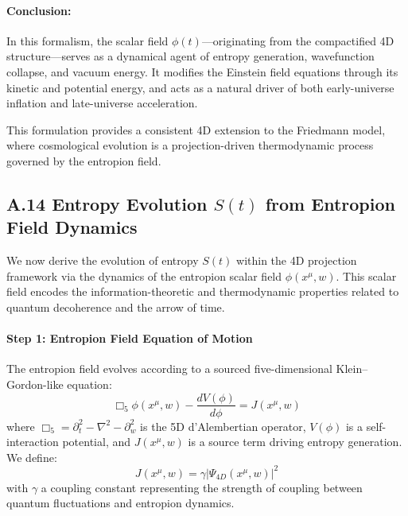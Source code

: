 \documentclass[12pt]{article}
\begin{document}
\vspace{1em}
\noindent
\paragraph{Conclusion:}

In this formalism, the scalar field \(\phi(t)\)—originating from the compactified 4D structure—serves as a dynamical agent of entropy generation, wavefunction collapse, and vacuum energy. It modifies the Einstein field equations through its kinetic and potential energy, and acts as a natural driver of both early-universe inflation and late-universe acceleration.

This formulation provides a consistent 4D extension to the Friedmann model, where cosmological evolution is a projection-driven thermodynamic process governed by the entropion field.
\subsection*{A.14 \quad Entropy Evolution \( S(t) \) from Entropion Field Dynamics}
\label{eq:A14}

We now derive the evolution of entropy \( S(t) \) within the 4D projection framework via the dynamics of the entropion scalar field \(\phi(x^\mu, w)\). This scalar field encodes the information-theoretic and thermodynamic properties related to quantum decoherence and the arrow of time.

\paragraph{Step 1: Entropion Field Equation of Motion}

The entropion field evolves according to a sourced five-dimensional Klein–Gordon-like equation:
\begin{equation}
\Box_5 \phi(x^\mu, w) - \frac{dV(\phi)}{d\phi} = J(x^\mu, w)
\label{eq:A14_EntropionEOM}
\end{equation}
where \(\Box_5 = \partial_t^2 - \nabla^2 - \partial_w^2\) is the 5D d'Alembertian operator, \(V(\phi)\) is a self-interaction potential, and \(J(x^\mu, w)\) is a source term driving entropy generation. We define:
\begin{equation}
J(x^\mu, w) = \gamma \left|\Psi_{4D}(x^\mu, w)\right|^2
\label{eq:A14_EntropionSource}
\end{equation}
with \(\gamma\) a coupling constant representing the strength of coupling between quantum fluctuations and entropion dynamics.
\end{document}
